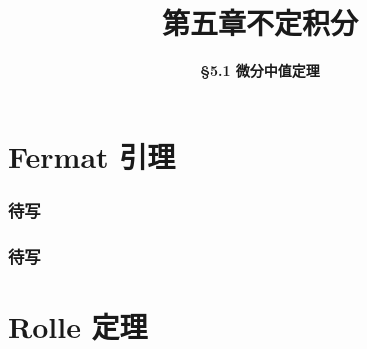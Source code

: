 \everymath{\displaystyle}



\title[第五章\\
不定积分]{\texorpdfstring{\LARGE \bfseries 第五章\quad 不定积分}{第五章 不定积分}} %
\author[\smaller \S 5.1\\
微分中值定理] %
{\Large \bfseries \S 5.1 微分中值定理}
\date{}





\begin{frame}

\titlepage %

\end{frame}



\section{Fermat 引理}


\begin{frame}
\frametitle{待写}

\end{frame}


\begin{frame}
\frametitle{待写}

\end{frame}


\section{Rolle 定理}

